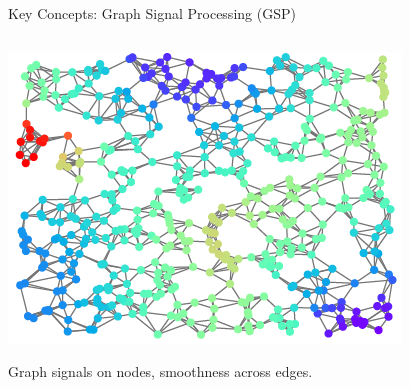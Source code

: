 \documentclass[aspectratio=169,xcolor=dvipsnames]{beamer}
\begin{document}
\begin{frame}{Key Concepts: Graph Signal Processing (GSP)}
\begin{columns}[c]
\begin{column}{0.45\textwidth}
\begin{itemize}
\end{itemize}
\vspace{0.5cm}
\begin{center}
    \includegraphics[width=0.65\linewidth]{GSP.png}
    
    \vspace{0.1cm}
    \tiny Graph signals on nodes, smoothness across edges.
\end{center}

\end{column}

\end{columns}

\end{frame}
\end{document}

